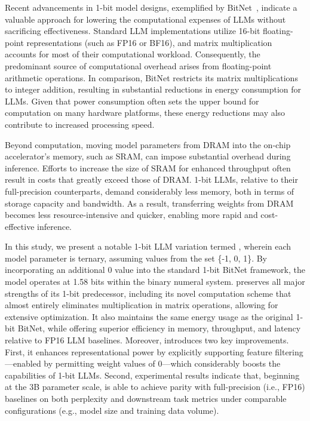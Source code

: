 Recent advancements in 1-bit model designs, exemplified by BitNet~\cite{bitnet}, indicate a valuable approach for lowering the computational expenses of LLMs without sacrificing effectiveness. Standard LLM implementations utilize 16-bit floating-point representations (such as FP16 or BF16), and matrix multiplication accounts for most of their computational workload. Consequently, the predominant source of computational overhead arises from floating-point arithmetic operations. In comparison, BitNet restricts its matrix multiplications to integer addition, resulting in substantial reductions in energy consumption for LLMs. Given that power consumption often sets the upper bound for computation on many hardware platforms, these energy reductions may also contribute to increased processing speed.

Beyond computation, moving model parameters from DRAM into the on-chip accelerator's memory, such as SRAM, can impose substantial overhead during inference. Efforts to increase the size of SRAM for enhanced throughput often result in costs that greatly exceed those of DRAM. 1-bit LLMs, relative to their full-precision counterparts, demand considerably less memory, both in terms of storage capacity and bandwidth. As a result, transferring weights from DRAM becomes less resource-intensive and quicker, enabling more rapid and cost-effective inference.

In this study, we present a notable 1-bit LLM variation termed \textbf{}, wherein each model parameter is ternary, assuming values from the set \{-1, 0, 1\}. By incorporating an additional 0 value into the standard 1-bit BitNet framework, the model operates at 1.58 bits within the binary numeral system.  preserves all major strengths of its 1-bit predecessor, including its novel computation scheme that almost entirely eliminates multiplication in matrix operations, allowing for extensive optimization. It also maintains the same energy usage as the original 1-bit BitNet, while offering superior efficiency in memory, throughput, and latency relative to FP16 LLM baselines. Moreover,  introduces two key improvements. First, it enhances representational power by explicitly supporting feature filtering—enabled by permitting weight values of 0—which considerably boosts the capabilities of 1-bit LLMs. Second, experimental results indicate that, beginning at the 3B parameter scale,  is able to achieve parity with full-precision (i.e., FP16) baselines on both perplexity and downstream task metrics under comparable configurations (e.g., model size and training data volume).

